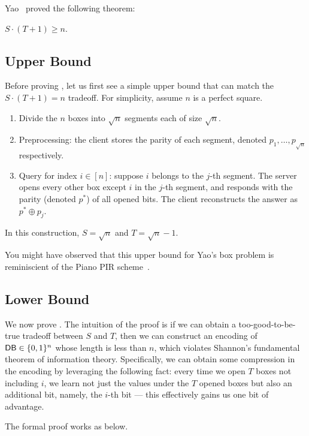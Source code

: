 Yao~\cite{yao} proved the following theorem:

\begin{theorem}
$S \cdot (T+1) \geq n$.   
\label{thm:yaobox}
\end{theorem} 


\subsection{Upper Bound}
Before proving , 
let us first see a simple upper bound that can match 
the $S\cdot (T+1) = n$ tradeoff.
For simplicity, assume $n$ is a perfect square.
\begin{enumerate}
    \item Divide the $n$ boxes into $\sqrt{n}$ segments each
of size $\sqrt{n}$. 
    \item Preprocessing: 
the client stores the parity of each segment, denoted $p_1, \ldots, p_{\sqrt{n}}$
respectively.
    \item Query for index $i \in [n]$: 
suppose $i$ belongs 
to the $j$-th segment. 
The server opens 
every other box 
except $i$ in the $j$-th segment,  %
and responds with the parity 
(denoted $p^*$)
of all opened bits.
The client reconstructs %
the answer 
as $p^* \oplus p_j$.
\end{enumerate}
In this construction, $S = \sqrt{n}$ and $T = \sqrt{n} - 1$.

You might have observed that this upper bound for Yao's
box problem is reminiscient of the  
Piano PIR scheme~\cite{piano}.


\subsection{Lower Bound} 
We now prove .
The intuition of the proof is 
if we can obtain a too-good-to-be-true  
tradeoff 
between $S$ and $T$, then we can construct 
an encoding of ${\sf DB} \in \{0, 1\}^n$ 
whose length is less than $n$, 
which violates 
Shannon's  
fundamental theorem of information theory.
Specifically, we can obtain some compression 
in the encoding 
by leveraging the following fact: every time 
we open $T$ boxes not including $i$, we 
learn not just the values under the $T$ opened boxes 
but also an additional 
bit, namely, the $i$-th bit --- this effectively  
gains us one bit of advantage.

The formal proof works as below.

